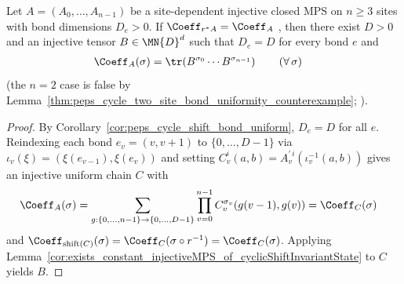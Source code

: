\begin{corollary}%
    \label{cor:exists_constant_injectiveMPS_of_cyclicShiftInvariantState_per_bond_pos}
    \leanok
    Let $A=(A_0,\ldots,A_{n-1})$ be a site-dependent injective closed MPS on
    $n\ge 3$ sites with bond dimensions $D_e>0$. If $\Coeff_{r^*A}=\Coeff_A$
    \cite[lines~1803--1890]{Molnar2018NormalPEPS}, then there exist $D>0$ and an
    injective tensor $B\in\MN{D}^d$ such that $D_e=D$ for every bond $e$ and
    \begin{align}
        \Coeff_A(\sigma)
         & =
        \tr\!\left(B^{\sigma_0}\cdots B^{\sigma_{n-1}}\right)
        \qquad (\forall\,\sigma)
        \notag
    \end{align}
    (the $n=2$ case is false by
    Lemma~\ref{thm:peps_cycle_two_site_bond_uniformity_counterexample};
    \cite{gap:peps_cyclic_mps_two_site_bond_uniformity}).
\end{corollary}
\begin{proof}\leanok
    By Corollary~\ref{cor:peps_cycle_shift_bond_uniform}, $D_e=D$ for all $e$.
    Reindexing each bond $e_v=(v,v+1)$ to $\{0,\ldots,D-1\}$ via
    $\iota_v(\xi)=(\xi(e_{v-1}),\xi(e_v))$ and setting
    $C_v^i(a,b)=A_v^{\prime\,i}(\iota_v^{-1}(a,b))$ gives an injective uniform
    chain $C$ with
    \begin{align}
        \Coeff_A(\sigma)
         & =\sum_{g:\{0,\ldots,n-1\}\to\{0,\ldots,D-1\}}
        \prod_{v=0}^{n-1}
        C_v^{\sigma_v}\!\left(g(v-1),g(v)\right)
        =\Coeff_C(\sigma)
        \notag
    \end{align}
    and $\Coeff_{\mathrm{shift}(C)}(\sigma)=\Coeff_C(\sigma\circ r^{-1})=\Coeff_C(\sigma)$.
    Applying Lemma~\ref{cor:exists_constant_injectiveMPS_of_cyclicShiftInvariantState}
    to $C$ yields $B$.
\end{proof}

